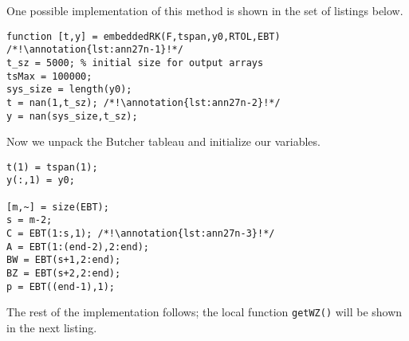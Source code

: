 One possible implementation of this method is shown in the set of listings below.
\begin{lstlisting}[style=myMatlab, name=lec27n-1]
function [t,y] = embeddedRK(F,tspan,y0,RTOL,EBT) /*!\annotation{lst:ann27n-1}!*/
t_sz = 5000; % initial size for output arrays
tsMax = 100000;
sys_size = length(y0);
t = nan(1,t_sz); /*!\annotation{lst:ann27n-2}!*/
y = nan(sys_size,t_sz);
\end{lstlisting}

\noindent Now we unpack the Butcher tableau and initialize our variables.

\begin{lstlisting}[style=myMatlab,name=lec27n-1]
% set initial values
t(1) = tspan(1);
y(:,1) = y0;

[m,~] = size(EBT);
s = m-2;
C = EBT(1:s,1); /*!\annotation{lst:ann27n-3}!*/
A = EBT(1:(end-2),2:end);
BW = EBT(s+1,2:end);
BZ = EBT(s+2,2:end);
p = EBT((end-1),1);
\end{lstlisting}
\noindent The rest of the implementation follows; the local function \lstinline[style=myMatlab]{getWZ()} will be shown in the next listing.

